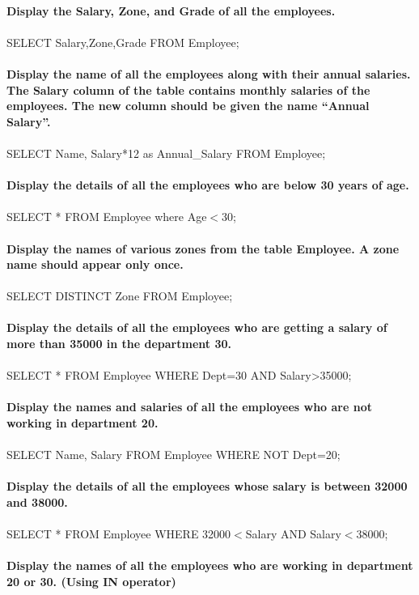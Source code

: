 \documentclass[
a4paper]{article}
\begin{document}
\begin{large}
		\\
		\textbf{Display the Salary, Zone, and Grade of all the employees.\\}\\
		SELECT Salary,Zone,Grade FROM Employee;\\
		\\
		\textbf{Display the name of all the employees along with their annual salaries. The Salary column of the table contains monthly salaries of the employees. The new column should be given the name “Annual Salary”.}\\
		\\
		SELECT Name, Salary*12 as Annual\_Salary FROM Employee;\\
		\\
		\textbf{Display the details of all the employees who are below 30 years of age. }\\
		\\
		SELECT * FROM Employee where Age$<$30;\\
		\\
		\textbf{Display the names of various zones from the table Employee. A zone name should appear only once.}\\
		\\
		SELECT DISTINCT Zone FROM Employee;\\
		\\
		\textbf{Display the details of all the employees who are getting a salary of more than 35000 in the department 30.}\\
		\\
		SELECT * FROM Employee WHERE Dept=30 AND Salary>35000;\\
		\\
		\textbf{Display the names and salaries of all the employees who are not working in department 20.}\\
		\\
		SELECT Name, Salary FROM Employee WHERE NOT Dept=20;\\
		\\
		\textbf{Display the details of all the employees whose salary is between 32000 and 38000.}\\
		\\
		SELECT * FROM Employee WHERE  32000$<$Salary AND Salary$<$38000;\\
		\\
		\textbf{Display the names of all the employees who are working in department 20 or 30. (Using IN operator)}\\
		\\

\end{large}
\end{document}
